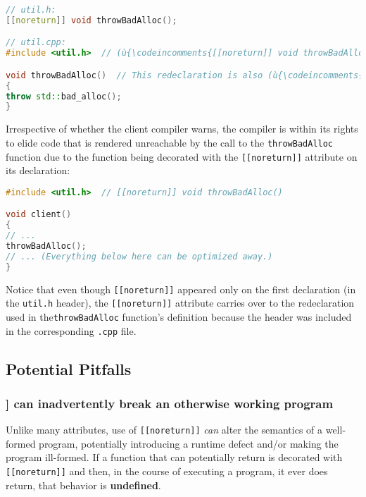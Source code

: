 \begin{lstlisting}[language=C++]
// util.h:
[[noreturn]] void throwBadAlloc();

// util.cpp:
#include <util.h>  // (ù{\codeincomments{[[noreturn]] void throwBadAlloc()}}ù)

void throwBadAlloc()  // This redeclaration is also (ù{\codeincomments{[[noreturn]]}}ù).
{
throw std::bad_alloc();
}
\end{lstlisting}


\noindent Irrespective of whether the client compiler warns, the compiler is within its
rights to elide code that is rendered unreachable by the call to the
\texttt{throwBadAlloc} function due to the function being decorated with the
\texttt{[[noreturn]]} attribute on its declaration:

\begin{lstlisting}[language=C++]
#include <util.h>  // [[noreturn]] void throwBadAlloc()

void client()
{
// ...
throwBadAlloc();
// ... (Everything below here can be optimized away.)
}
\end{lstlisting}


\noindent Notice that even though \texttt{[[noreturn]]} appeared only on the first
declaration (in the \texttt{util.h} header), the \texttt{[[noreturn]]}
attribute carries over to the redeclaration used in the\linebreak[4] \texttt{throwBadAlloc}
function's definition because the header was included in the
corresponding \texttt{.cpp} file.

\subsection[Potential Pitfalls]{Potential Pitfalls}\label{noreturn-potential-pitfalls}

\subsubsection[\tt{[[noreturn]]} can inadvertently break an otherwise working program]{{\ParaCode [[noreturn]]} can inadvertently break an otherwise working program}\label{[[noreturn]]-can-inadvertently-break-an-otherwise-working-program}

Unlike many attributes, use of \texttt{[[noreturn]]} \emph{can} alter
the semantics of a well-formed program, potentially introducing a
runtime defect and/or making the program ill-formed. If a function that
can potentially return is decorated with \texttt{[[noreturn]]} and then,
in the course of executing a program, it ever does return, that behavior
is \textbf{undefined}.

